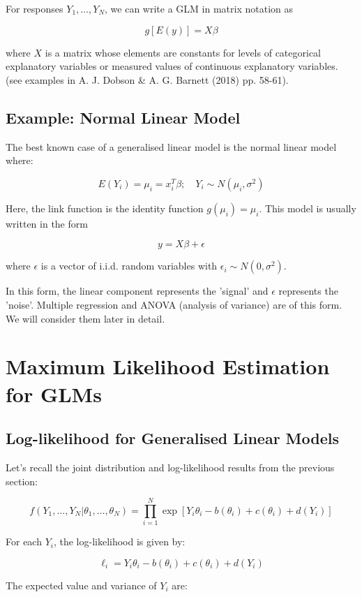 \documentclass[11pt]{article}
\begin{document}
For responses $Y_1, \dots, Y_N$, we can write a GLM in matrix notation as

\[ g[E(y)] = X\beta \]

where $X$ is a matrix whose elements are constants for levels of categorical explanatory variables or measured values of continuous explanatory variables. (see examples in A. J. Dobson \& A. G. Barnett (2018) pp. 58-61).

\subsection{Example: Normal Linear Model}

The best known case of a generalised linear model is the normal linear model where:

\[ E(Y_i) = \mu_i = x_i^T \beta; \quad Y_i \sim N(\mu_i, \sigma^2) \]

Here, the link function is the identity function \( g(\mu_i) = \mu_i \). This model is usually written in the form

\[ y = X\beta + \epsilon \]

where \(\epsilon\) is a vector of i.i.d. random variables with \(\epsilon_i \sim N(0, \sigma^2)\).

In this form, the linear component represents the 'signal' and \(\epsilon\) represents the 'noise'. Multiple regression and ANOVA (analysis of variance) are of this form. We will consider them later in detail.

\section{Maximum Likelihood Estimation for GLMs}

\subsection{Log-likelihood for Generalised Linear Models}

Let's recall the joint distribution and log-likelihood results from the previous section:

\[ f(Y_1, \dots, Y_N | \theta_1, \dots, \theta_N) = \prod_{i=1}^{N} \exp[Y_i \theta_i - b(\theta_i) + c(\theta_i) + d(Y_i)] \]

For each $Y_i$, the log-likelihood is given by:

\[ \ell_i = Y_i \theta_i - b(\theta_i) + c(\theta_i) + d(Y_i) \]

The expected value and variance of $Y_i$ are:
\end{document}
